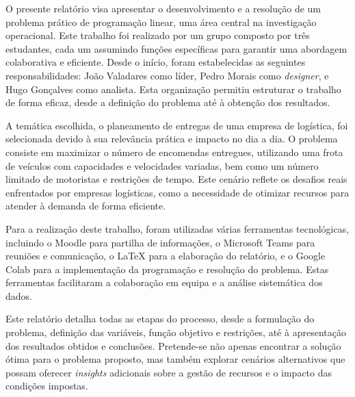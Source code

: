 O presente relatório visa apresentar o desenvolvimento e a resolução de um problema prático de programação linear, uma área central na investigação operacional.
Este trabalho foi realizado por um grupo composto por três estudantes, cada um assumindo funções específicas para garantir uma abordagem colaborativa e eficiente.
Desde o início, foram estabelecidas as seguintes responsabilidades: João Valadares como líder, Pedro Morais como \textit{designer}, e Hugo Gonçalves como analista.
Esta organização permitiu estruturar o trabalho de forma eficaz, desde a definição do problema até à obtenção dos resultados.

A temática escolhida, o planeamento de entregas de uma empresa de logística, foi selecionada devido à sua relevância prática e impacto no dia a dia.
O problema consiste em maximizar o número de encomendas entregues, utilizando uma frota de veículos com capacidades e velocidades variadas, bem como um número limitado de motoristas e restrições de tempo.
Este cenário reflete os desafios reais enfrentados por empresas logísticas, como a necessidade de otimizar recursos para atender à demanda de forma eficiente.

Para a realização deste trabalho, foram utilizadas várias ferramentas tecnológicas, incluindo o Moodle para partilha de informações, o Microsoft Teams para reuniões e comunicação, o LaTeX para a elaboração do relatório, e o Google Colab para a implementação da programação e resolução do problema.
Estas ferramentas facilitaram a colaboração em equipa e a análise sistemática dos dados.

Este relatório detalha todas as etapas do processo, desde a formulação do problema, definição das variáveis, função objetivo e restrições, até à apresentação dos resultados obtidos e conclusões.
Pretende-se não apenas encontrar a solução ótima para o problema proposto, mas também explorar cenários alternativos que possam oferecer \textit{insights} adicionais sobre a gestão de recursos e o impacto das condições impostas.